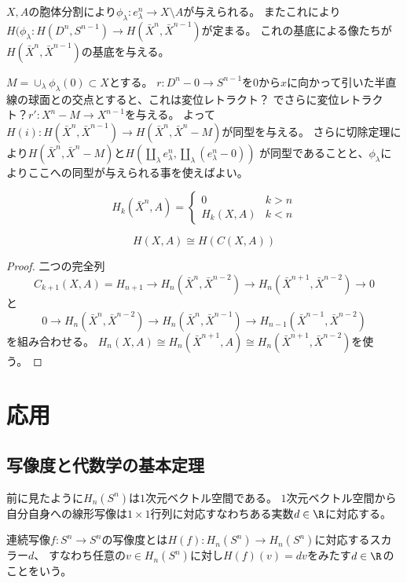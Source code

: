 \documentclass{jsarticle}
\begin{document}
$X, A$の胞体分割により$\phi_\lambda\colon e^n_\lambda\to X\setminus A$が与えられる。
またこれにより$H(\phi_\lambda\colon H(D^n,S^{n-1})\to H(\bar{X}^n, \bar{X}^{n-1})$が定まる。
これの基底による像たちが$H(\bar{X}^n, \bar{X}^{n-1})$の基底を与える。

$M=\cup_\lambda\phi_\lambda(0)\subset X$とする。
$r\colon D^n-0\to S^{n-1}$を$0$から$x$に向かって引いた半直線の球面との交点とすると、これは変位レトラクト？
でさらに変位レトラクト？$r'\colon X^n-M\to X^{n-1}$を与える。
よって$H(i)\colon H(\bar{X}^n,\bar{X}^{n-1})\to H(\bar{X}^n,\bar{X}^n-M)$が同型を与える。
さらに切除定理により$H(\bar{X}^n, \bar{X}^n-M)$と$H(\coprod_\lambda e_\lambda^n,\coprod_\lambda(e_\lambda^n-0))$
が同型であることと、$\phi_\lambda$によりここへの同型が与えられる事を使えばよい。

\begin{lem}
\[
H_k(\bar{X}^n,A)=\begin{cases}0&k>n\\H_k(X,A)&k<n\end{cases}
\]
\end{lem}

\begin{thm}
\[
H(X,A)\cong H(C(X,A))
\]
\end{thm}
\begin{proof}
二つの完全列
\[
C_{k+1}(X,A)=H_{n+1}\to H_n(\bar{X}^n,\bar{X}^{n-2})\to H_n(\bar{X}^{n+1},\bar{X}^{n-2})\to0
\]
と
\[
0\to H_n(\bar{X}^n,\bar{X}^{n-2})\to H_n(\bar{X}^n,\bar{X}^{n-1})\to H_{n-1}(\bar{X}^{n-1},\bar{X}^{n-2})
\]
を組み合わせる。
$H_n(X,A)\cong H_n(\bar{X}^{n+1},A)\cong H_n(\bar{X}^{n+1},\bar{X}^{n-2})$を使う。
\end{proof}

\section{応用}
\subsection{写像度と代数学の基本定理}
前に見たように$H_n(S^n)$は$1$次元ベクトル空間である。
$1$次元ベクトル空間から自分自身への線形写像は$1\times1$行列に対応すなわちある実数$d\in\R$に対応する。

\begin{dfn}
連続写像$f:S^n\to S^n$の写像度とは$H(f):H_n(S^n)\to H_n(S^n)$に対応するスカラー$d$、
すなわち任意の$v\in H_n(S^n)$に対し$H(f)(v)=dv$をみたす$d\in\R$のことをいう。
\end{dfn}
\end{document}
